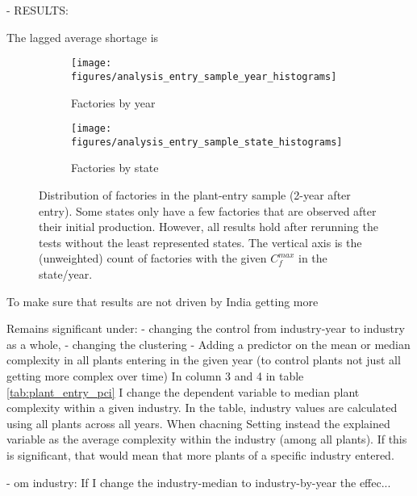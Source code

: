 \documentclass[11pt]{article}
\begin{document}
- RESULTS:

The lagged average shortage is 

\begin{figure}
     \centering
     \begin{subfigure}[b]{0.45\textwidth}
         \centering
         \texttt{[image: figures/analysis\_entry\_sample\_year\_histograms]}
	 \caption{Factories by year}
         \label{fig:entry_by_year}
     \end{subfigure}
     \hfill
     \begin{subfigure}[b]{0.45\textwidth}
         \centering
         \texttt{[image: figures/analysis\_entry\_sample\_state\_histograms]}
	 \caption{Factories by state}
         \label{fig:entry_by_state}
     \end{subfigure}
     \caption{Distribution of factories in the plant-entry sample (2-year after entry). Some states only have a few factories that are observed after their initial production. However, all results hold after rerunning the tests without the least represented states. The vertical axis is the (unweighted) count of factories with the given $C^{max}_{f}$ in the state/year.}
        \label{fig:new_entry_sample}
\end{figure}

To make sure that results are not driven by India getting more 

Remains significant under: 
 - changing the control from industry-year to industry as a whole,
 - changing the clustering
 - Adding a predictor on the mean or median complexity in all plants entering in the given year (to control plants not just all getting more complex over time)
In column 3 and 4 in table \ref{tab:plant_entry_pci} I change the dependent variable to median plant complexity within a given industry. In the table, industry values are calculated using all plants across all years. When chacning 
Setting instead the explained variable as the average complexity within the industry (among all plants). If this is significant, that would mean that more plants of a specific industry entered.

- om industry: If I change the industry-median to industry-by-year the effec...
\end{document}
